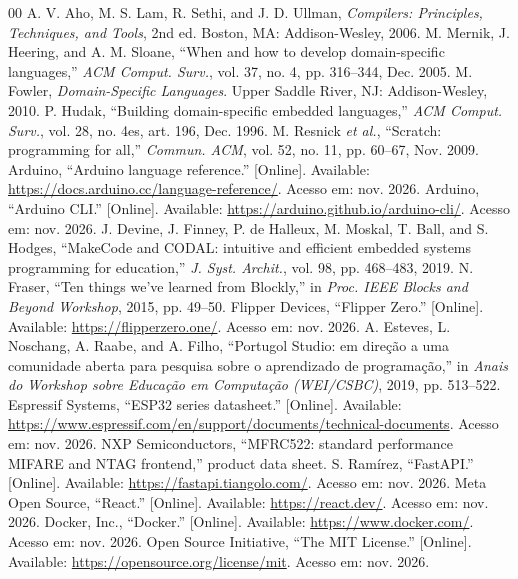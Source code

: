 \documentclass[conference]{IEEEtran}
\begin{document}
\begin{thebibliography}{00}
 A. V. Aho, M. S. Lam, R. Sethi, and J. D. Ullman, \textit{Compilers: Principles, Techniques, and Tools}, 2nd ed. Boston, MA: Addison-Wesley, 2006.
 M. Mernik, J. Heering, and A. M. Sloane, ``When and how to develop domain-specific languages,'' \textit{ACM Comput. Surv.}, vol. 37, no. 4, pp. 316--344, Dec. 2005.
 M. Fowler, \textit{Domain-Specific Languages}. Upper Saddle River, NJ: Addison-Wesley, 2010.
 P. Hudak, ``Building domain-specific embedded languages,'' \textit{ACM Comput. Surv.}, vol. 28, no. 4es, art. 196, Dec. 1996.
 M. Resnick \textit{et al.}, ``Scratch: programming for all,'' \textit{Commun. ACM}, vol. 52, no. 11, pp. 60--67, Nov. 2009.
 Arduino, ``Arduino language reference.'' [Online]. Available: \url{https://docs.arduino.cc/language-reference/}. Acesso em: nov. 2026.
 Arduino, ``Arduino CLI.'' [Online]. Available: \url{https://arduino.github.io/arduino-cli/}. Acesso em: nov. 2026.
 J. Devine, J. Finney, P. de Halleux, M. Moskal, T. Ball, and S. Hodges, ``MakeCode and CODAL: intuitive and efficient embedded systems programming for education,'' \textit{J. Syst. Archit.}, vol. 98, pp. 468--483, 2019.
 N. Fraser, ``Ten things we've learned from Blockly,'' in \textit{Proc. IEEE Blocks and Beyond Workshop}, 2015, pp. 49--50.
 Flipper Devices, ``Flipper Zero.'' [Online]. Available: \url{https://flipperzero.one/}. Acesso em: nov. 2026.
 A. Esteves, L. Noschang, A. Raabe, and A. Filho, ``Portugol Studio: em direção a uma comunidade aberta para pesquisa sobre o aprendizado de programação,'' in \textit{Anais do Workshop sobre Educação em Computação (WEI/CSBC)}, 2019, pp. 513--522.
 Espressif Systems, ``ESP32 series datasheet.'' [Online]. Available: \url{https://www.espressif.com/en/support/documents/technical-documents}. Acesso em: nov. 2026.
 NXP Semiconductors, ``MFRC522: standard performance MIFARE and NTAG frontend,'' product data sheet. %
 S. Ramírez, ``FastAPI.'' [Online]. Available: \url{https://fastapi.tiangolo.com/}. Acesso em: nov. 2026.
 Meta Open Source, ``React.'' [Online]. Available: \url{https://react.dev/}. Acesso em: nov. 2026.
 Docker, Inc., ``Docker.'' [Online]. Available: \url{https://www.docker.com/}. Acesso em: nov. 2026.
 Open Source Initiative, ``The MIT License.'' [Online]. Available: \url{https://opensource.org/license/mit}. Acesso em: nov. 2026.
\end{thebibliography}
\end{document}
